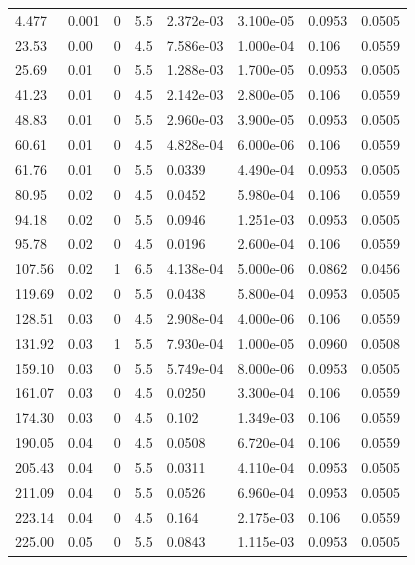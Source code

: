 \documentclass[preview]{standalone}
\begin{document}
{{\begin{tabular}{L{1.2cm}C{1.2cm} C{0.3cm}C{0.5cm} C{1.4cm}C{1.4cm} C{1.4cm}C{1.4cm}}
  4.477  &  0.001  & 0     & 5.5 &  2.372e-03  & 3.100e-05  & 0.0953 &  0.0505   \\ 
  23.53  &  0.00  & 0     & 4.5 &  7.586e-03  & 1.000e-04  & 0.106 &  0.0559   \\ 
  25.69  &  0.01  & 0     & 5.5 &  1.288e-03  & 1.700e-05  & 0.0953 &  0.0505   \\ 
  41.23  &  0.01  & 0     & 4.5 &  2.142e-03  & 2.800e-05  & 0.106 &  0.0559   \\ 
  48.83  &  0.01  & 0     & 5.5 &  2.960e-03  & 3.900e-05  & 0.0953 &  0.0505   \\ 
  60.61  &  0.01  & 0     & 4.5 &  4.828e-04  & 6.000e-06  & 0.106 &  0.0559   \\ 
  61.76  &  0.01  & 0     & 5.5 &  0.0339  & 4.490e-04  & 0.0953 &  0.0505   \\ 
  80.95  &  0.02  & 0     & 4.5 &  0.0452  & 5.980e-04  & 0.106 &  0.0559   \\ 
  94.18  &  0.02  & 0     & 5.5 &  0.0946  & 1.251e-03  & 0.0953 &  0.0505   \\ 
  95.78  &  0.02  & 0     & 4.5 &  0.0196  & 2.600e-04  & 0.106 &  0.0559   \\ 
  107.56  &  0.02  & 1     & 6.5 &  4.138e-04  & 5.000e-06  & 0.0862 &  0.0456   \\ 
  119.69  &  0.02  & 0     & 5.5 &  0.0438  & 5.800e-04  & 0.0953 &  0.0505   \\ 
  128.51  &  0.03  & 0     & 4.5 &  2.908e-04  & 4.000e-06  & 0.106 &  0.0559   \\ 
  131.92  &  0.03  & 1     & 5.5 &  7.930e-04  & 1.000e-05  & 0.0960 &  0.0508   \\ 
  159.10  &  0.03  & 0     & 5.5 &  5.749e-04  & 8.000e-06  & 0.0953 &  0.0505   \\ 
  161.07  &  0.03  & 0     & 4.5 &  0.0250  & 3.300e-04  & 0.106 &  0.0559   \\ 
  174.30  &  0.03  & 0     & 4.5 &  0.102  & 1.349e-03  & 0.106 &  0.0559   \\ 
  190.05  &  0.04  & 0     & 4.5 &  0.0508  & 6.720e-04  & 0.106 &  0.0559   \\ 
  205.43  &  0.04  & 0     & 5.5 &  0.0311  & 4.110e-04  & 0.0953 &  0.0505   \\ 
  211.09  &  0.04  & 0     & 5.5 &  0.0526  & 6.960e-04  & 0.0953 &  0.0505   \\ 
  223.14  &  0.04  & 0     & 4.5 &  0.164  & 2.175e-03  & 0.106 &  0.0559   \\ 
  225.00  &  0.05  & 0     & 5.5 &  0.0843  & 1.115e-03  & 0.0953 &  0.0505   \\ 

\end{tabular}}}
\end{document}
